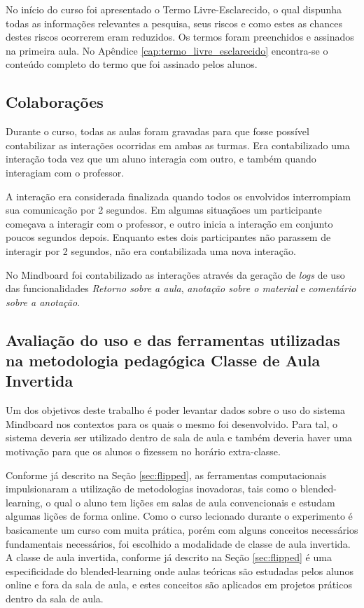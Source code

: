 No início do curso foi apresentado o Termo Livre-Esclarecido, o qual dispunha todas as informações relevantes a pesquisa, seus riscos e como estes as chances destes riscos ocorrerem eram reduzidos. Os termos foram preenchidos e assinados na primeira aula. No Apêndice \ref{cap:termo_livre_esclarecido} encontra-se o conteúdo completo do termo que foi assinado pelos alunos.

\subsection{Colaborações}

Durante o curso, todas as aulas foram gravadas para que fosse possível contabilizar as interações ocorridas em ambas as turmas. Era contabilizado uma interação toda vez que um aluno interagia com outro, e também quando interagiam com o professor.

A interação era considerada finalizada quando todos os envolvidos interrompiam sua comunicação por 2 segundos. Em algumas situaçãoes um participante começava a interagir com o professor, e outro inicia a interação em conjunto poucos segundos depois. Enquanto estes dois participantes não parassem de interagir por 2 segundos, não era contabilizada uma nova interação.

No Mindboard foi contabilizado as interações através da geração de \emph{logs} de uso das funcionalidades \emph{Retorno sobre a aula}, \emph{anotação sobre o material} e \emph{comentário sobre a anotação}.

\subsection{Avaliação do uso e das ferramentas utilizadas na metodologia pedagógica Classe de Aula Invertida}

Um dos objetivos deste trabalho é poder levantar dados sobre o uso do sistema Mindboard nos contextos para os quais o mesmo foi desenvolvido. Para tal, o sistema deveria ser utilizado dentro de sala de aula e também deveria haver uma motivação para que os alunos o fizessem no horário extra-classe.

Conforme já descrito na Seção \ref{sec:flipped}, as ferramentas computacionais impulsionaram a utilização de metodologias inovadoras, tais como o blended-learning, o qual o aluno tem lições em salas de aula convencionais e estudam algumas lições de forma online. Como o curso lecionado durante o experimento é basicamente um curso com muita prática, porém com alguns conceitos necessários fundamentais necessários, foi escolhido a modalidade de classe de aula invertida. A classe de aula invertida, conforme já descrito na Seção \ref{sec:flipped} é uma especificidade do blended-learning onde aulas teóricas são estudadas pelos alunos online e fora da sala de aula, e estes conceitos são aplicados em projetos práticos dentro da sala de aula.

